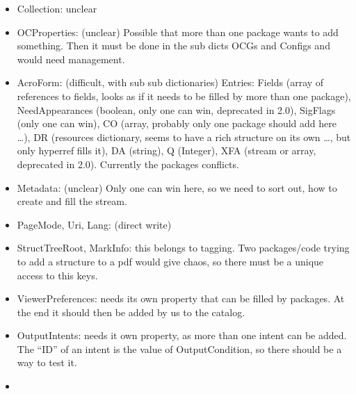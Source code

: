 \documentclass{article}
\begin{document}
\begin{itemize}
 \item Collection: unclear
 \item OCProperties: (unclear) Possible that more than one package wants to add something. Then it must be done in the sub dicts OCGs and Configs and would need management.
 \item AcroForm: (difficult, with sub sub dictionaries) Entries: Fields (array of references to fields, looks as if it needs to be filled by more than one package), NeedAppearances (boolean, only one can win, deprecated in 2.0), SigFlags (only one can win), CO (array, probably only one package should add here \ldots), DR (resources dictionary, seems to have a rich structure on its own \ldots, but only hyperref fills it), DA (string), Q (Integer), XFA (stream or array, deprecated in 2.0).
     Currently the packages conflicts.

 \item Metadata: (unclear) Only one can win here, so we need to sort out, how to create and fill the stream.
 \item PageMode, Uri, Lang: (direct write)
 \item StructTreeRoot, MarkInfo: this belongs to tagging. Two packages/code trying to add a structure to a pdf would give chaos, so there must be a unique access to this keys.
 \item ViewerPreferences: needs its own property that can be filled by packages. At the end it should then be added by us to the catalog.

 \item OutputIntents: needs it own property, as more than one intent can be added. The \enquote{ID} of an intent is the value of OutputCondition, so there should be a way to test it.
\item
\end{itemize}
\end{document}
